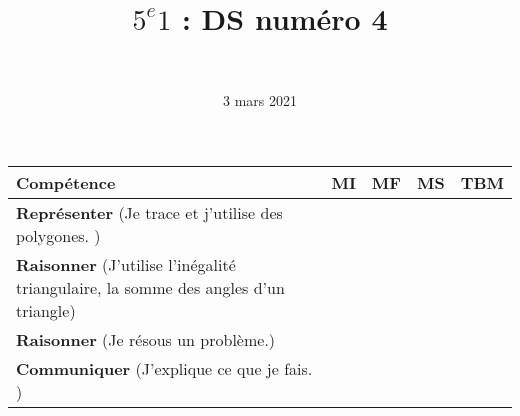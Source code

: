 \documentclass[a4paper,11pt]{exam}
\author{\ }
\date{3 mars 2021}
\title{$5^e 1$ : DS num\'ero 4}
\begin{document}
%	

	\maketitle
	

%
\begin{small}
	\begin{center}
		\begin{tabular}{|@{\ }l@{\ }|@{\ }c@{\ }|@{\ }c@{\ }|@{\ }c@{\ }|@{\ }c@{\ }|}
			\hline
			\textbf{Compétence} & \textbf{MI} & \textbf{MF} & \textbf{MS} & \textbf{TBM} \\
			\hline
			\textbf{Représenter} (Je trace et j'utilise des polygones.
			) &  \ \ & \ \ & \ \ & \ \  \\
			\hline	
			\textbf{Raisonner} (J'utilise l'inégalité triangulaire, la somme des angles d'un triangle) & \ \ & \ \ &  \ \  & \ \ \\
			\hline
			\textbf{Raisonner} (Je résous un problème.) & \ \ & \ \ &  \ \  & \ \ \\
			\hline
			\textbf{Communiquer} (J'explique ce que je fais. ) &  \ \ & \ \ & \ \ & \ \  \\
			\hline
		\end{tabular}
	\end{center}
\end{small}	

	
	
%	
%
%
%
%
%








%


\label{LastPage}
\end{document}
